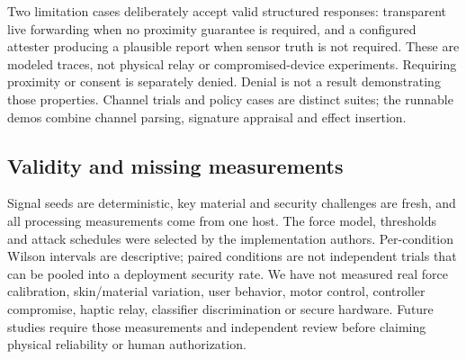 Two limitation cases deliberately accept valid structured responses: transparent
live forwarding when no proximity guarantee is required, and a configured
attester producing a plausible report when sensor truth is not required. These
are modeled traces, not physical relay or compromised-device experiments. Requiring
proximity or consent is separately denied. Denial is not a result demonstrating
those properties. Channel trials and policy cases are distinct suites; the
runnable demos combine channel parsing, signature appraisal and effect insertion.

\subsection{Validity and missing measurements}
Signal seeds are deterministic, key material and security challenges are fresh,
and all processing measurements come from one host. The force model, thresholds
and attack schedules were selected by the implementation authors. Per-condition
Wilson intervals are descriptive; paired conditions are not independent trials
that can be pooled into a deployment security rate. We have not measured real
force calibration, skin/material variation, user behavior, motor control,
controller compromise, haptic relay, classifier discrimination or secure hardware.
Future studies require those measurements and independent review before claiming
physical reliability or human authorization.

